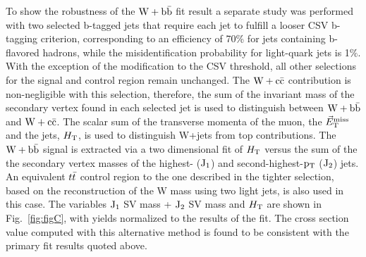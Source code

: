 To show the robustness of the $\mathrm{W+\mathrm{b\bar{b}}}$ fit result a separate study was performed with
two selected b-tagged jets that require each jet to fulfill a looser CSV b-tagging criterion, corresponding 
to an efficiency  of 70\%
for jets containing b-flavored hadrons, while the misidentification probability for light-quark jets is 1$\%$.
With the exception of the modification to the CSV threshold, all other selections for the signal
and control region remain unchanged. The $\mathrm{W+\mathrm{c\bar{c}}}$ contribution is non-negligible with this selection,
therefore, the sum of the invariant mass of the secondary vertex found in each selected jet
is used to distinguish between $\mathrm{W+\mathrm{b\bar{b}}}$ and $\mathrm{W+\mathrm{c\bar{c}}}$. The scalar sum of the transverse momenta of the
muon, the $\vec{E}_\mathrm{T}^{\mathrm{miss}}\;$ and the jets,
$H_{\rm{T}}$, is used to distinguish W+jets from
top contributions. 
The $\mathrm{W+\mathrm{b\bar{b}}}$ signal is extracted via a two dimensional fit of 
$H_{\rm{T}}$ versus
the sum of the the  secondary vertex masses of the highest- ($\rm{J_1}$) and second-highest-$\mathrm{p_{T}}$ ($\rm{J_2}$) jets. 
An equivalent $t\bar{t}$ control region to the one described in the
tighter selection, based on the reconstruction of the W mass using two light jets, is also used in this case.
The variables $\rm{J_1}$ SV mass + $\rm{J_2}$ SV mass and $H_{\rm{T}}$ are shown in Fig.~\ref{fig:figC}, with yields 
normalized to the results of the fit.
The cross section value computed with this alternative method 
is found to be consistent
with the primary fit results quoted above.

